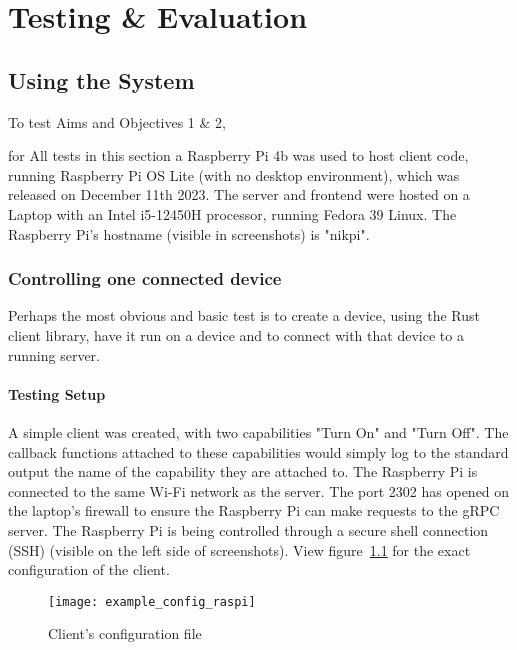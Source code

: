 \chapter{Testing \& Evaluation} \label{cha:testing}
\section{Using the System}
To test Aims and Objectives 1 \& 2, 

for All tests in this section a Raspberry Pi 4b was used to host client code, running Raspberry Pi OS Lite (with no desktop environment), which was released on December 11th 2023. The server and frontend were hosted on a Laptop with an Intel i5-12450H processor, running Fedora 39 Linux. The Raspberry Pi's hostname (visible in screenshots) is "nikpi".
\subsection{Controlling one connected device} \label{cha:testing:onedevice}
Perhaps the most obvious and basic test is to create a device, using the Rust client library, have it run on a device and to connect with that device to a running server. 

\subsubsection{Testing Setup}
A simple client was created, with two capabilities "Turn On" and "Turn Off". The callback functions attached to these capabilities would simply log to the standard output the name of the capability they are attached to. The Raspberry Pi is connected to the same Wi-Fi network as the server. The port 2302 has opened on the laptop's firewall to ensure the Raspberry Pi can make requests to the gRPC server. The Raspberry Pi is being controlled through a secure shell connection (SSH) (visible on the left side of screenshots). View figure~\ref{fig:example_config_raspi} for the exact configuration of the client.
\begin{figure}[h]
\caption{Client's configuration file}
\texttt{[image: example\_config\_raspi]}
\label{fig:example_config_raspi}
\end{figure}

